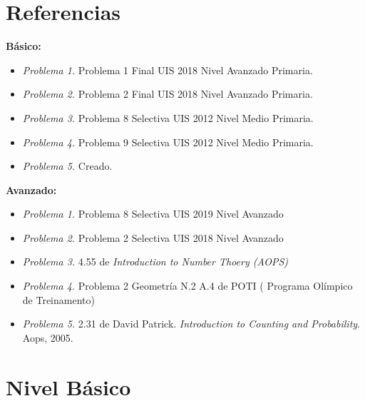 \newpage
\section*{Referencias}
\textbf{Básico: }
\begin{itemize}
	\item \textit{Problema 1.} Problema 1 Final UIS 2018 Nivel Avanzado Primaria. 
	\item \textit{Problema 2.} Problema 2 Final UIS 2018 Nivel Avanzado Primaria. 
	\item \textit{Problema 3.} Problema 8 Selectiva UIS 2012 Nivel Medio Primaria.
	\item \textit{Problema 4.} Problema 9 Selectiva UIS 2012 Nivel Medio Primaria.
	\item \textit{Problema 5.} Creado.
\end{itemize}

\textbf{Avanzado: }
\begin{itemize}
	\item \textit{Problema 1.} Problema 8 Selectiva UIS 2019 Nivel Avanzado
	\item	\textit{Problema 2.} Problema 2 Selectiva UIS 2018 Nivel Avanzado
	\item	\textit{Problema 3.} 4.55 de \textit{Introduction to Number Thoery (AOPS)}
	\item	\textit{Problema 4.} Problema 2 Geometría N.2 A.4 de POTI (	Programa Olímpico de Treinamento)
	\item	\textit{Problema 5.} 2.31 de David Patrick. \textit{Introduction to Counting and Probability}. Aops, 2005.
\end{itemize}


\newpage
\section{Nivel Básico}\label{basico:2020_15_agosto}

\begin{center}
\end{center}


